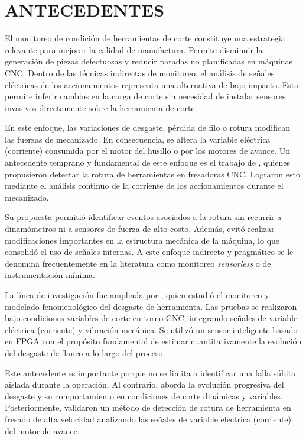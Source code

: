 \newpage
\section{ANTECEDENTES}

El monitoreo de condición de herramientas de corte constituye una estrategia relevante para mejorar la calidad de manufactura. Permite disminuir la generación de piezas defectuosas y reducir paradas no planificadas en máquinas CNC. Dentro de las técnicas indirectas de monitoreo, el análisis de señales eléctricas de los accionamientos representa una alternativa de bajo impacto. Esto permite inferir cambios en la carga de corte sin necesidad de instalar sensores invasivos directamente sobre la herramienta de corte.

En este enfoque, las variaciones de desgaste, pérdida de filo o rotura modifican las fuerzas de mecanizado. En consecuencia, se altera la variable eléctrica (corriente) consumida por el motor del husillo o por los motores de avance. Un antecedente temprano y fundamental de este enfoque es el trabajo de \cite{romero2003}, quienes propusieron detectar la rotura de herramientas en fresadoras CNC. Lograron esto mediante el análisis continuo de la corriente de los accionamientos durante el mecanizado.

Su propuesta permitió identificar eventos asociados a la rotura sin recurrir a dinamómetros ni a sensores de fuerza de alto costo. Además, evitó realizar modificaciones importantes en la estructura mecánica de la máquina, lo que consolidó el uso de señales internas. A este enfoque indirecto y pragmático se le denomina frecuentemente en la literatura como monitoreo \textit{sensorless} o de instrumentación mínima.

La línea de investigación fue ampliada por \cite{trejo2010}, quien estudió el monitoreo y modelado fenomenológico del desgaste de herramienta. Las pruebas se realizaron bajo condiciones variables de corte en torno CNC, integrando señales de variable eléctrica (corriente) y vibración mecánica. Se utilizó un sensor inteligente basado en FPGA con el propósito fundamental de estimar cuantitativamente la evolución del desgaste de flanco a lo largo del proceso.

Este antecedente es importante porque no se limita a identificar una falla súbita aislada durante la operación. Al contrario, aborda la evolución progresiva del desgaste y su comportamiento en condiciones de corte dinámicas y variables. Posteriormente, \cite{sevilla2011} validaron un método de detección de rotura de herramienta en fresado de alta velocidad analizando las señales de variable eléctrica (corriente) del motor de avance.

